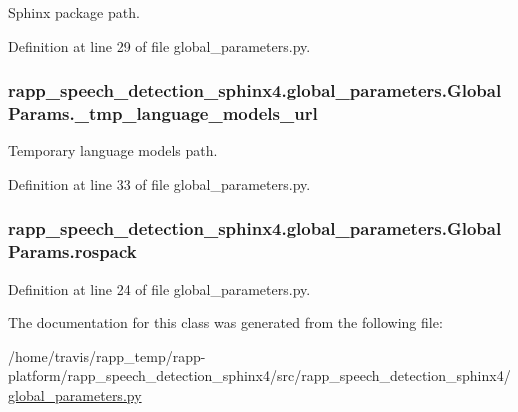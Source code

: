 Sphinx package path. 



Definition at line 29 of file global\-\_\-parameters.\-py.

\hypertarget{classrapp__speech__detection__sphinx4_1_1global__parameters_1_1GlobalParams_ac21cbb95712d8873cf5c357e7006bf59}{
\subsubsection[{\-\_\-tmp\-\_\-language\-\_\-models\-\_\-url}]{\setlength{\rightskip}{0pt plus 5cm}rapp\-\_\-speech\-\_\-detection\-\_\-sphinx4.\-global\-\_\-parameters.\-Global\-Params.\-\_\-tmp\-\_\-language\-\_\-models\-\_\-url\hspace{0.3cm}{\ttfamily [private]}}}\label{classrapp__speech__detection__sphinx4_1_1global__parameters_1_1GlobalParams_ac21cbb95712d8873cf5c357e7006bf59}


Temporary language models path. 



Definition at line 33 of file global\-\_\-parameters.\-py.

\hypertarget{classrapp__speech__detection__sphinx4_1_1global__parameters_1_1GlobalParams_a544bff3ab91e6ec8c782ba2b4386ef0a}{
\subsubsection[{rospack}]{\setlength{\rightskip}{0pt plus 5cm}rapp\-\_\-speech\-\_\-detection\-\_\-sphinx4.\-global\-\_\-parameters.\-Global\-Params.\-rospack}}\label{classrapp__speech__detection__sphinx4_1_1global__parameters_1_1GlobalParams_a544bff3ab91e6ec8c782ba2b4386ef0a}


Definition at line 24 of file global\-\_\-parameters.\-py.



The documentation for this class was generated from the following file\-:\begin{DoxyCompactItemize}
\item 
/home/travis/rapp\-\_\-temp/rapp-\/platform/rapp\-\_\-speech\-\_\-detection\-\_\-sphinx4/src/rapp\-\_\-speech\-\_\-detection\-\_\-sphinx4/\hyperlink{global__parameters_8py}{global\-\_\-parameters.\-py}\end{DoxyCompactItemize}
